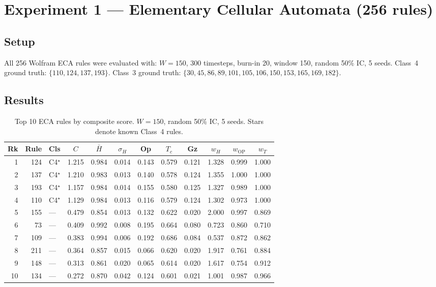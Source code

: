 \documentclass[12pt,a4paper]{article}
\begin{document}
\section{Experiment 1 --- Elementary Cellular Automata (256 rules)}

\subsection{Setup}

All 256 Wolfram ECA rules were evaluated with:
$W = 150$, 300 timesteps, burn-in 20, window 150, random 50\% IC, 5 seeds.
Class~4 ground truth: $\{110, 124, 137, 193\}$.
Class~3 ground truth: $\{30, 45, 86, 89, 101, 105, 106, 150, 153, 165, 169, 182\}$.

\subsection{Results}

\begin{table}[h]
\centering
\caption{Top 10 ECA rules by composite score.
$W{=}150$, random 50\% IC, 5 seeds.
Stars denote known Class~4 rules.}
\begin{tabular}{rrlccccccccc}
\toprule
Rk & Rule & Cls & $C$ & $\bar{H}$ & $\sigma_H$ & Op & $T_c$ & Gz
   & $w_H$ & $w_\text{OP}$ & $w_T$ \\
\midrule
 1 & 124 & C4$^\star$ & 1.215 & 0.984 & 0.014 & 0.143 & 0.579 & 0.121 & 1.328 & 0.999 & 1.000 \\
 2 & 137 & C4$^\star$ & 1.210 & 0.983 & 0.013 & 0.140 & 0.578 & 0.124 & 1.355 & 1.000 & 1.000 \\
 3 & 193 & C4$^\star$ & 1.157 & 0.984 & 0.014 & 0.155 & 0.580 & 0.125 & 1.327 & 0.989 & 1.000 \\
 4 & 110 & C4$^\star$ & 1.129 & 0.984 & 0.013 & 0.116 & 0.579 & 0.124 & 1.302 & 0.973 & 1.000 \\
 5 & 155 & ---        & 0.479 & 0.854 & 0.013 & 0.132 & 0.622 & 0.020 & 2.000 & 0.997 & 0.869 \\
 6 &  73 & ---        & 0.409 & 0.992 & 0.008 & 0.195 & 0.664 & 0.080 & 0.723 & 0.860 & 0.710 \\
 7 & 109 & ---        & 0.383 & 0.994 & 0.006 & 0.192 & 0.686 & 0.084 & 0.537 & 0.872 & 0.862 \\
 8 & 211 & ---        & 0.364 & 0.857 & 0.015 & 0.066 & 0.620 & 0.020 & 1.917 & 0.761 & 0.884 \\
 9 & 148 & ---        & 0.313 & 0.861 & 0.020 & 0.065 & 0.614 & 0.020 & 1.617 & 0.754 & 0.912 \\
10 & 134 & ---        & 0.272 & 0.870 & 0.042 & 0.124 & 0.601 & 0.021 & 1.001 & 0.987 & 0.966 \\
\bottomrule
\end{tabular}
\end{table}
\end{document}
